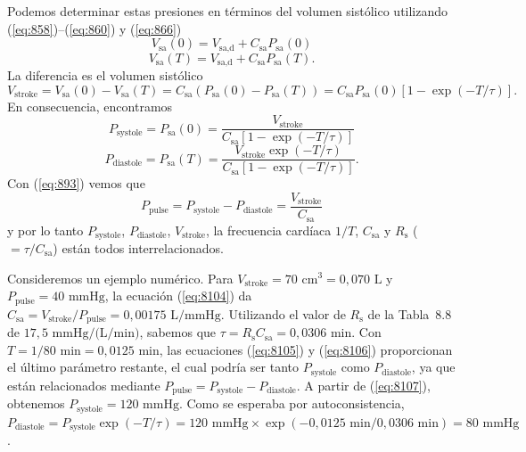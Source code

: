 \documentclass[12pt]{book}
\begin{document}
Podemos determinar estas presiones en términos del volumen sistólico utilizando (\ref{eq:858})--(\ref{eq:860}) y (\ref{eq:866})
\begin{equation}
V_{\text{sa}}(0) = V_{\text{sa,d}} + C_{\text{sa}} P_{\text{sa}}(0)
\label{eq:8102}
\end{equation}
\begin{equation}
V_{\text{sa}}(T) = V_{\text{sa,d}} + C_{\text{sa}} P_{\text{sa}}(T).
\label{eq:8103}
\end{equation}
La diferencia es el volumen sistólico
\begin{equation}
V_{\text{stroke}} = V_{\text{sa}}(0) - V_{\text{sa}}(T) = C_{\text{sa}}(P_{\text{sa}}(0) - P_{\text{sa}}(T)) = C_{\text{sa}} P_{\text{sa}}(0) [1 - \exp(- T/\tau)].
\label{eq:8104}
\end{equation}
En consecuencia, encontramos
\begin{equation}
P_{\text{systole}} = P_{\text{sa}}(0) = \frac{V_{\text{stroke}}}{C_{\text{sa}} [1 - \exp(- T/\tau)]}
\label{eq:8105}
\end{equation}
\begin{equation}
P_{\text{diastole}} = P_{\text{sa}}(T) = \frac{V_{\text{stroke}} \exp(- T/\tau)}{C_{\text{sa}} [1 - \exp(- T/\tau)]}.
\label{eq:8106}
\end{equation}
Con (\ref{eq:893}) vemos que
\begin{equation}
P_{\text{pulse}} = P_{\text{systole}} - P_{\text{diastole}} = \frac{V_{\text{stroke}}}{C_{\text{sa}}}
\label{eq:8107}
\end{equation}
y por lo tanto $P_{\text{systole}}$, $P_{\text{diastole}}$, $V_{\text{stroke}}$, la frecuencia cardíaca $1/T$, $C_{\text{sa}}$ y $R_{\text{s}}$ ($= \tau/C_{\text{sa}}$) están todos interrelacionados.

Consideremos un ejemplo numérico. Para $V_{\text{stroke}} = 70\text{ cm}^3 = 0{,}070\text{ L}$ y $P_{\text{pulse}} = 40\text{ mmHg}$, la ecuación (\ref{eq:8104}) da $C_{\text{sa}} = V_{\text{stroke}}/P_{\text{pulse}} = 0{,}00175\text{ L/mmHg}$. Utilizando el valor de $R_{\text{s}}$ de la Tabla~8.8 de $17{,}5\text{ mmHg/(L/min)}$, sabemos que $\tau = R_{\text{s}} C_{\text{sa}} = 0{,}0306\text{ min}$. Con $T = 1/80\text{ min} = 0{,}0125\text{ min}$, las ecuaciones (\ref{eq:8105}) y (\ref{eq:8106}) proporcionan el último parámetro restante, el cual podría ser tanto $P_{\text{systole}}$ como $P_{\text{diastole}}$, ya que están relacionados mediante $P_{\text{pulse}} = P_{\text{systole}} - P_{\text{diastole}}$. A partir de (\ref{eq:8107}), obtenemos $P_{\text{systole}} = 120\text{ mmHg}$. Como se esperaba por autoconsistencia, $P_{\text{diastole}} = P_{\text{systole}} \exp(- T/\tau) = 120\text{ mmHg} \times \exp(- 0{,}0125\text{ min}/0{,}0306\text{ min}) = 80\text{ mmHg}$.
\end{document}

